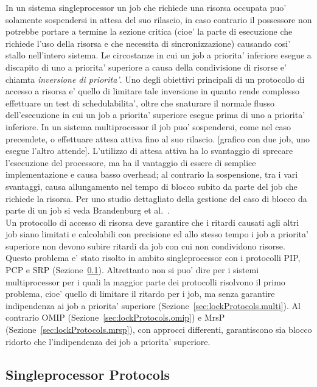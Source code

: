 In un sistema singleprocessor un job che richiede una risorsa occupata puo' solamente sospendersi in attesa del suo rilascio, in caso contrario il possessore non potrebbe portare a termine la sezione critica (cioe' la parte di esecuzione che richiede l'uso della risorsa e che necessita di sincronizzazione) causando cosi' stallo nell'intero sistema. Le circostanze in cui un job a priorita' inferiore esegue a discapito di uno a priorita' superiore a causa della condivisione di risorse e' chiamta \textit{inversione di priorita'}. Uno degli obiettivi principali di un protocollo di accesso a risorsa e' quello di limitare tale inversione in quanto rende complesso effettuare un test di schedulabilita', oltre che snaturare il normale flusso dell'esecuzione in cui un job a priorita' superiore esegue prima di uno a priorita' inferiore. In un sistema multiprocessor il job puo' sospendersi, come nel caso precendete, o effettuare attesa attiva fino al suo rilascio. [grafico con due job, uno esegue l'altro attende]. L'utilizzo di attesa attiva ha lo svantaggio di sprecare l'esecuzione del processore, ma ha il vantaggio di essere di semplice implementazione e causa basso overhead; al contrario la sospensione, tra i vari svantaggi, causa allungamento nel tempo di blocco subito da parte del job che richiede la risorsa. Per uno studio dettagliato della gestione del caso di blocco da parte di un job si veda Brandenburg et al.~\cite{Brandenburg:2008:RSM:1440456.1440601}.\\

Un protocollo di accesso di risorsa deve garantire che i ritardi causati agli altri job siano limitati e calcolabili con precisione ed allo stesso tempo i job a priorita' superiore non devono subire ritardi da job con cui non condividono risorse. Questo problema e' stato risolto in ambito singleprocessor con i protocolli PIP, PCP e SRP (Sezione~\ref{sec:lockProtocols.single}). Altrettanto non si puo' dire per i sistemi multiprocessor per i quali la maggior parte dei protocolli risolvono il primo problema, cioe' quello di limitare il ritardo per i job, ma senza garantire indipendenza ai job a priorita' superiore (Sezione~\ref{sec:lockProtocols.multi}). Al contrario OMIP (Sezione~\ref{sec:lockProtocols.omip}) e MrsP (Sezione~\ref{sec:lockProtocols.mrsp}), con approcci differenti, garantiscono sia blocco ridorto che l'indipendenza dei job a priorita' superiore.\\

\subsection{Singleprocessor Protocols}
\label{sec:lockProtocols.single}

